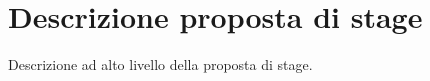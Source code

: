 \section{Descrizione proposta di stage}
\label{sez:descrizione-stage}

Descrizione ad alto livello della proposta di stage.